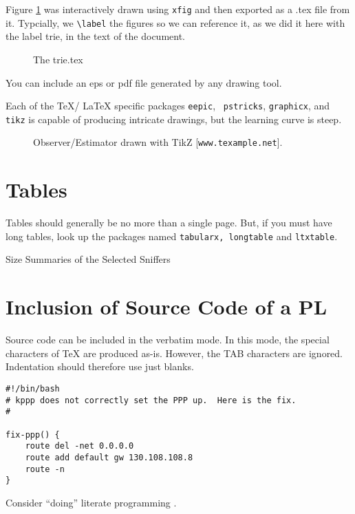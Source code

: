 Figure \ref{trie} was interactively drawn using {\tt xfig} and
then exported as a .tex file from it.  Typcially, we \verb|\label| the figures
so we can reference it, as we did it here with the label trie, in the
text of the document.

\begin{figure}[ht]
\centering

\caption{The trie.tex}\label{trie}
\end{figure}

You can include an eps or pdf file generated by any drawing tool.

Each of the \TeX/ \LaTeX{} specific packages {\tt eepic}, {\tt
  pstricks}, {\tt graphicx}, and {\tt tikz} is capable of producing
intricate drawings, but the learning curve is steep.

\begin{figure}[htb]
\centering

\caption{Observer/Estimator drawn with TikZ [{\tt www.texample.net}].}
\end{figure}

\section{Tables}

Tables should generally be no more than a single page.  But, if you
must have long tables, look up the packages named {\tt tabularx,
  longtable} and {\tt ltxtable}.

\begin{table}[htb]
\centering

\caption{Size Summaries of the Selected Sniffers}\label{metric}
\end{table}

\section{Inclusion of Source Code of a PL}

Source code can be included in the verbatim mode.  In this mode, the
special characters of \TeX{} are produced as-is.  However, the TAB
characters are ignored.  Indentation should therefore use just blanks.

\begin{verbatim}
#!/bin/bash
# kppp does not correctly set the PPP up.  Here is the fix.
#

fix-ppp() {
    route del -net 0.0.0.0
    route add default gw 130.108.108.8
    route -n
}
\end{verbatim}


Consider ``doing'' literate programming \cite{LP-KNUTH}.


